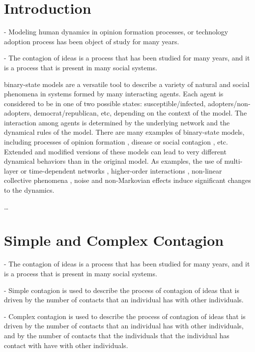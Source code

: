 \section{\label{sec:Introduction} Introduction}

- Modeling human dynamics in opinion formation processes, or technology adoption process has been object of study for many years. 

- The contagion of ideas is a process that has been studied for many years, and it is a process that is present in many social systems.

binary-state models are a versatile tool to describe a variety of natural and social phenomena in systems formed by many interacting agents. Each agent is considered to be in one of two possible states: susceptible/infected, adopters/non-adopters, democrat/republican, etc, depending on the context of the model. The interaction among agents is determined by the underlying network and the dynamical rules of the model. There are many examples of binary-state models, including processes of opinion formation \cite{Voter-original,sood-2005,fernandez-gracia-2014,redner-2019}, disease or social contagion \cite{granovetter-1978,pastor-satorras-2015}, etc. Extended and modified versions of these models can lead to very different dynamical behaviors than in the original model. As examples, the use of multi-layer  \cite{diakonova-2014,diakonova-2016,amato-2017} or time-dependent networks \cite{vazquez-2008}, higher-order interactions \cite{de-arruda-2020, iacopini-2019, cencetti-2021}, non-linear collective phenomena \cite{castellano-2009,peralta-2018}, noise \cite{carro-2016} and non-Markovian \cite{van-mieghem-2013,starnini-2017,peralta-2020A,chen-2020} effects induce significant changes to the dynamics.

\dots

\section{\label{sec:Simple and Complex Contagion} Simple and Complex Contagion}

- The contagion of ideas is a process that has been studied for many years, and it is a process that is present in many social systems. 

- Simple contagion is used to describe the process of contagion of ideas that is driven by the number of contacts that an individual has with other individuals.

- Complex contagion is used to describe the process of contagion of ideas that is driven by the number of contacts that an individual has with other individuals, and by the number of contacts that the individuals that the individual has contact with have with other individuals.

